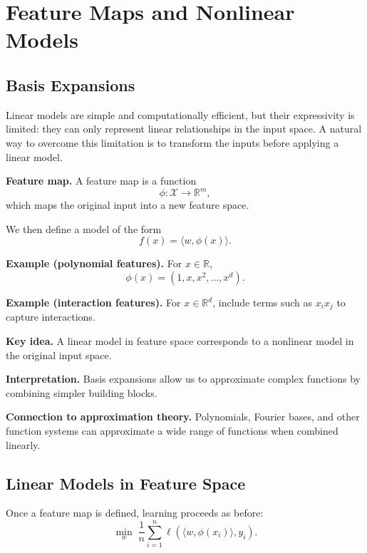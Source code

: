 \chapter{Feature Maps and Nonlinear Models}

\section{Basis Expansions}

Linear models are simple and computationally efficient, but their expressivity is limited: they can only represent linear relationships in the input space. A natural way to overcome this limitation is to transform the inputs before applying a linear model.

\medskip

\noindent
\textbf{Feature map.}  
A feature map is a function
\[
\phi : \mathcal{X} \to \mathbb{R}^m,
\]
which maps the original input into a new feature space.

\medskip

\noindent
We then define a model of the form
\[
f(x) = \langle w, \phi(x) \rangle.
\]

\medskip

\noindent
\textbf{Example (polynomial features).}  
For $x \in \mathbb{R}$,
\[
\phi(x) = (1, x, x^2, \dots, x^d).
\]

\medskip

\noindent
\textbf{Example (interaction features).}  
For $x \in \mathbb{R}^d$, include terms such as $x_i x_j$ to capture interactions.

\medskip

\noindent
\textbf{Key idea.}  
A linear model in feature space corresponds to a nonlinear model in the original input space.

\medskip

\noindent
\textbf{Interpretation.}  
Basis expansions allow us to approximate complex functions by combining simpler building blocks.

\medskip

\noindent
\textbf{Connection to approximation theory.}  
Polynomials, Fourier bases, and other function systems can approximate a wide range of functions when combined linearly.

\section{Linear Models in Feature Space}

Once a feature map is defined, learning proceeds as before:
\[
\min_w \; \frac{1}{n} \sum_{i=1}^n \ell(\langle w, \phi(x_i) \rangle, y_i).
\]

